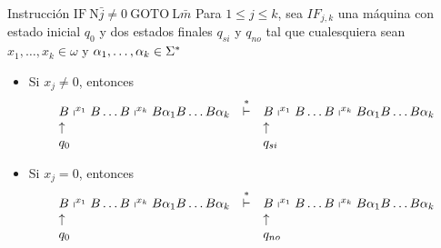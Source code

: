 \begin{frame}
  \begin{block}{Instrucción $\mathrm{IF} \ \mathrm{N}\bar{j} \not = 0 \ \mathrm{GOTO} \ \mathrm{L}\bar{m}$}
    \PN Para $1 \leq j \leq k$, sea $IF_{j,k}$ una máquina con estado inicial $q_{0}$ y dos estados finales $q_{si}$ y
    $q_{no}$ tal que cualesquiera sean $x_{1}, \dotsc, x_{k} \in \omega$ y $\alpha_{1}, \dotsc, \alpha_{k} \in \Sigma^{\ast}$
    \begin{itemize}
      \item Si $x_{j} \neq 0$, entonces
      \[
        \begin{array}{lcl}
          B \shortmid^{x_{1}} B \dotsc B \shortmid^{x_{k}} B \alpha_{1} B \dotsc B \alpha_{k} &\overset{\ast}{\vdash}& B
            \shortmid^{x_{1}} B \dotsc B \shortmid^{x_{k}} B \alpha_{1} B \dotsc B \alpha_{k} \\
          \uparrow && \uparrow \\
          q_{0} && q_{si}
        \end{array}
      \]

      \item Si $x_{j} = 0$, entonces
      \[
        \begin{array}{lcl}
          B \shortmid^{x_{1}} B \dotsc B \shortmid^{x_{k}} B \alpha_{1} B \dotsc B \alpha_{k} &\overset{\ast}{\vdash}& B
            \shortmid^{x_{1}} B \dotsc B \shortmid^{x_{k}} B \alpha_{1} B \dotsc B \alpha_{k} \\
          \uparrow && \uparrow \\
          q_{0} && q_{no}
        \end{array}
      \]
    \end{itemize}
  \end{block}
\end{frame}

